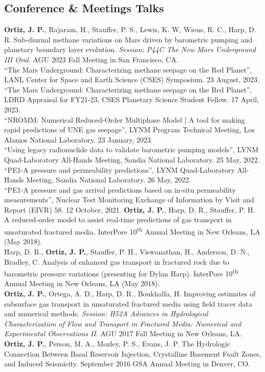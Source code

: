 \documentclass[11pt, letterpaper]{article}
\newcommand{\years}[1]{\marginnote{\scriptsize #1}}
\begin{document}
\subsection*{Conference \& Meetings Talks}
\years{2023}\textbf{Ortiz, J. P.}, Rajaram, H., Stauffer, P. S., Lewis, K. W,
Wiens, R. C., Harp, D. R. Sub-diurnal methane variations on Mars driven by
barometric pumping and planetary boundary layer evolution. \textit{Session:
P44C The New Mars Underground III Oral}. AGU 2023 Fall Meeting in San
Francisco, CA.\\
%
\years{2023} ``The Mars Underground: Characterizing methane seepage on the Red
Planet'', LANL Center for Space and Earth Science (CSES) Symposium. 23 August,
2023.\\ 
%
\years{2023} ``The Mars Underground: Characterizing methane seepage on the Red
Planet'', LDRD Appraisal for FY21-23, CSES Planetary Science Student Fellow. 17 April,
2023.\\
%
\years{2023} ``NROMM: Numerical Reduced-Order Multiphase Model | A tool for
making rapid predictions of UNE gas seepage'', LYNM Program Technical Meeting,
Los Alamos National Laboratory. 23 January, 2023.\\
%
\years{2022} ``Using legacy radionuclide data to validate barometric pumping
models'', LYNM Quad-Laboratory All-Hands Meeting, Sandia National Laboratory.
25 May, 2022.\\
%
\years{2022} ``PE1-A pressure and permeability predictions'', LYNM
Quad-Laboratory All-Hands Meeting, Sandia National Laboratory. 26 May, 2022.\\
%
\years{2021}
``PE1-A pressure and gas arrival predictions based on in-situ permeability
measurements'', Nuclear Test Monitoring Exchange of Information by Visit and
Report (EIVR) 58. 12 October, 2021.
%
\years{2018}\textbf{Ortiz, J. P.}, Harp, D. R., Stauffer, P. H. A reduced-order
model to assist real-time predictions of gas transport in unsaturated fractured
media. InterPore 10\textsuperscript{th} Annual Meeting in New Orleans, LA (May
2018).\\
%
\years{2018}Harp, D. R., \textbf{Ortiz, J. P.}, Stauffer, P. H., Viswanathan,
H., Anderson, D. N., Bradley, C. Analysis of enhanced gas transport in
fractured rock due to barometric pressure variations (presenting for Dylan
Harp). InterPore 10\textsuperscript{th} Annual Meeting in New Orleans, LA (May
2018).\\
%
\years{2017}\textbf{Ortiz, J. P.}, Ortega, A. D., Harp, D. R., Boukhalfa, H.
Improving estimates of subsurface gas transport in unsaturated fractured media
using field tracer data and numerical methods.
\textit{Session: H52A Advances in Hydrological Characterization of Flow and
Transport in Fractured Media: Numerical and Experimental Observations II}. AGU
2017 Fall Meeting in New Orleans, LA.\\
%
\years{2016}\textbf{Ortiz, J. P.}, Person, M. A., Mozley, P. S., Evans, J. P.
The Hydrologic Connection Between Basal Reservoir Injection, Crystalline
Basement Fault Zones, and Induced Seismicity. September 2016
GSA Annual Meeting in Denver, CO.\\
\end{document}
